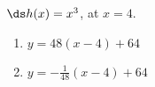 {$\ds h(x) = x^3$, at $x=4$.
}
{
\begin{enumerate}
	\item $y = 48(x-4)+64$
	\item	$y = -\frac{1}{48}(x-4)+64$
\end{enumerate}}
